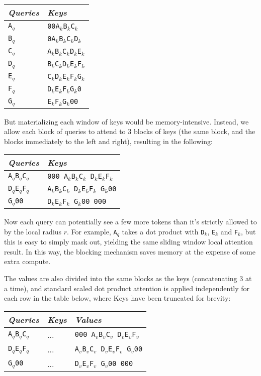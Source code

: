 \documentclass[11pt,a4paper]{article}
\begin{document}
\begin{tabular}{l|l} 
{\em Queries} & {\em Keys} \\ \hline
\texttt{A$_q$}  &   \texttt{00A$_k$B$_k$C$_k$} \\
\texttt{B$_q$}  &   \texttt{0A$_k$B$_k$C$_k$D$_k$} \\
\texttt{C$_q$}  &   \texttt{A$_k$B$_k$C$_k$D$_k$E$_k$} \\
\texttt{D$_q$}  &   \texttt{B$_k$C$_k$D$_k$E$_k$F$_k$} \\
\texttt{E$_q$}  &   \texttt{C$_k$D$_k$E$_k$F$_k$G$_k$} \\
\texttt{F$_q$}  &   \texttt{D$_k$E$_k$F$_k$G$_k$0} \\
\texttt{G$_q$}  &   \texttt{E$_k$F$_k$G$_k$00} \\
\end{tabular}

But materializing each window of keys would be memory-intensive. Instead, we allow each block of queries to attend to 3 blocks of keys (the same block, and the blocks immediately to the left and right), resulting in the following:

\begin{tabular}{l|l} 
{\em Queries} & {\em Keys} \\ \hline
\texttt{A$_q$B$_q$C$_q$}  & \texttt{000 A$_k$B$_k$C$_k$ D$_k$E$_k$F$_k$} \\
\texttt{D$_q$E$_q$F$_q$}  & \texttt{A$_k$B$_k$C$_k$ D$_k$E$_k$F$_k$ G$_k$00}  \\ 
\texttt{G$_q$00}          & \texttt{D$_k$E$_k$F$_k$ G$_k$00 000} \\
\end{tabular}

Now each query can potentially see a few more tokens than it's strictly allowed to by the local radius $r$.  For example, \texttt{A$_q$} takes a dot product with \texttt{D$_k$}, \texttt{E$_k$} and \texttt{F$_k$}, but this is easy to simply mask out, yielding the same sliding window local attention result. In this way, the blocking mechanism saves memory at the expense of some extra compute.

The values are also divided into the same blocks as the keys (concatenating 3 at a time), and standard scaled dot product attention is applied independently for each row in the table below, where Keys have been truncated for brevity:



 \begin{tabular}{l|l|l} 
 {\em Queries} & {\em Keys} & {\em Values} \\ \hline
 \texttt{A$_q$B$_q$C$_q$}    & ...  & \texttt{000 A$_v$B$_v$C$_v$ D$_v$E$_v$F$_v$} \\
 \texttt{D$_q$E$_q$F$_q$}    & ...   & \texttt{A$_v$B$_v$C$_v$ D$_v$E$_v$F$_v$ G$_v$00}  \\
 \texttt{G$_q$00}            & ...  & \texttt{D$_v$E$_v$F$_v$ G$_v$00 000}  \\
 \end{tabular}
\end{document}
